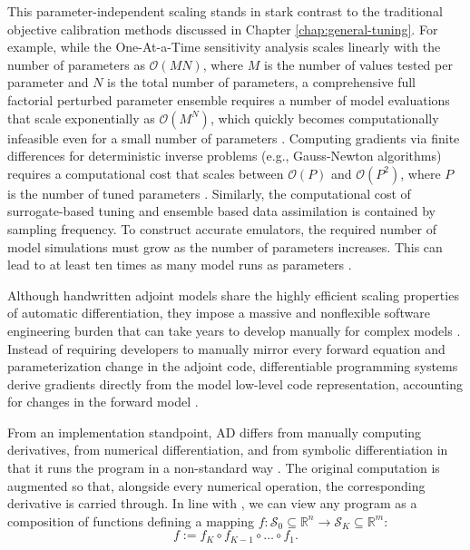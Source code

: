 This parameter-independent scaling stands in stark contrast to the traditional objective calibration methods discussed in Chapter \ref{chap:general-tuning}. For example, while the One-At-a-Time sensitivity analysis scales linearly with the number of parameters as $\mathcal{O}(MN)$, where $M$ is the number of values tested per parameter and $N$ is the total number of parameters, a comprehensive full factorial perturbed parameter ensemble requires a number of model evaluations that scale exponentially as $\mathcal{O}(M^N)$, which quickly becomes computationally infeasible even for a small number of parameters \parencite{eidhammer_extensible_2024}. Computing gradients via finite differences for deterministic inverse problems (e.g., Gauss-Newton algorithms) requires a computational cost that scales between $\mathcal{O}(P)$ and $\mathcal{O}(P^2)$, where $P$ is the number of tuned parameters \parencite{tett_calibrating_2017}. Similarly, the computational cost of surrogate-based tuning and ensemble based data assimilation is contained by sampling frequency. To construct accurate emulators, the required number of model simulations must grow as the number of parameters increases. This can lead to at least ten times as many model runs as parameters \parencite{loeppky_choosing_2009,raoult_parameter_2025,bonnet_tuning_2025}.

Although handwritten adjoint models share the highly efficient scaling properties of automatic differentiation, they impose a massive and nonflexible software engineering burden that can take years to develop manually for complex models \parencite{raoult_parameter_2025}. Instead of requiring developers to manually mirror every forward equation and parameterization change in the adjoint code, differentiable programming systems derive gradients directly from the model low-level code representation, accounting for changes in the forward model \parencite{moses_instead_2020}.

From an implementation standpoint, AD differs from manually computing derivatives, from numerical differentiation, and from symbolic differentiation in that it runs the program in a non-standard way \parencite{baydin_automatic_2015}. The original computation is augmented so that, alongside every numerical operation, the corresponding derivative is carried through. In line with \cite{blondel_elements_2024}, we can view any program as a composition of functions defining a mapping $f : \mathcal{S}_0 \subseteq \mathbb{R}^n \longrightarrow \mathcal{S}_K \subseteq \mathbb{R}^m $: 
$$
f := f_K \circ f_{K-1} \circ \dots \circ f_1.
$$

